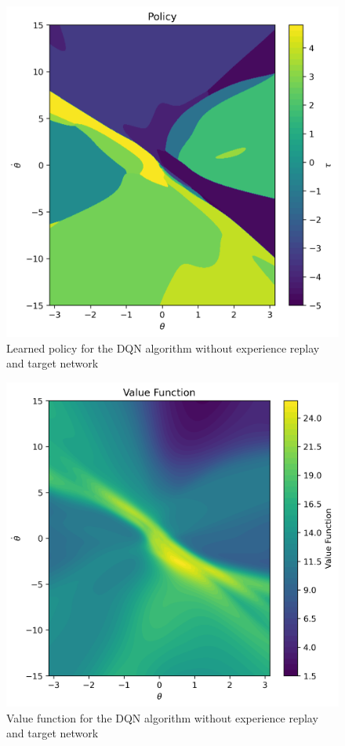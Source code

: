 \documentclass[conference]{IEEEtran}
\begin{document}
\begin{figure}[h]
\centering
\includegraphics[width=0.98\linewidth]{../figures/no_target_no_replay/ctr_policy_150_1.png}
\caption{Learned policy for the DQN algorithm without experience replay and target network}
\label{fig:no_target_no_replay_policy}
\end{figure}
\begin{figure}[h]
\centering
\includegraphics[width=0.99\linewidth]{../figures/no_target_no_replay/ctr_value_func_150_1.png}
\caption{Value function for the DQN algorithm without experience replay and target network}
\label{fig:no_target_no_replay_value_function}
\end{figure}
\end{document}
